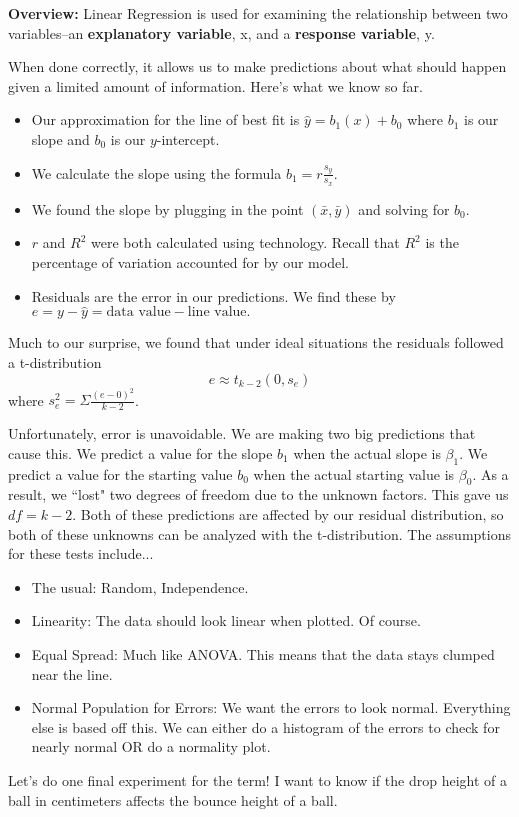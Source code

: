 \documentclass[12pt]{amsart}
\theoremstyle{definition}
\begin{document}
 \noindent \textbf{Overview:} Linear Regression is used for examining the relationship between two variables--an \textbf{explanatory variable}, x, and a \textbf{response variable}, y.\\
 \begin{framed}When done correctly, it allows us to make predictions about what should happen given a limited amount of information. Here's what we know so far.
\begin{itemize}
\item Our approximation for the line of best fit is $\hat{y}=b_1(x)+b_0$ where $b_1$ is our slope and $b_0$ is our $y$-intercept.
\item We calculate the slope using the formula $b_1=r\frac{s_y}{s_x}$.
\item We found the slope by plugging in the point $(\bar{x},\bar{y})$ and solving for $b_0$.
\item $r$ and $R^2$ were both calculated using technology. Recall that $R^2$ is the percentage of variation accounted for by our model.
\item Residuals are the error in our predictions. We find these by $e=y-\hat{y}=\text{data value}-\text{line value}.$
\end{itemize}\end{framed}
\begin{framed}
 
Much to our surprise, we found that under ideal situations the residuals followed a t-distribution $$e\approx t_{k-2}(0,s_e)$$ where $s^2_e=\Sigma\frac{(e-0)^2}{k-2}$.\\

\end{framed}
Unfortunately, error is unavoidable. We are making two big predictions that cause this. We predict a value for the slope $b_1$ when the actual slope is $\beta_1$. We predict a value for the starting value $b_0$ when the actual starting value is $\beta_0$. As a result, we ``lost" two degrees of freedom due to the unknown factors. This gave us $df=k-2$. Both of these predictions are affected by our residual distribution, so both of these unknowns can be analyzed with the t-distribution. The assumptions for these tests include...
\begin{itemize}
\item The usual: Random, Independence.
\item Linearity: The data should look linear when plotted. Of course.
\item Equal Spread: Much like ANOVA. This means that the data stays clumped near the line.
\item Normal Population for Errors: We want the errors to look normal. Everything else is based off this. We can either do a histogram of the errors to check for nearly normal OR do a normality plot.
\end{itemize}
\newpage\noindent Let's do one final experiment for the term! I want to know if the drop height of a ball in centimeters affects the bounce height of a ball.
\end{document}
